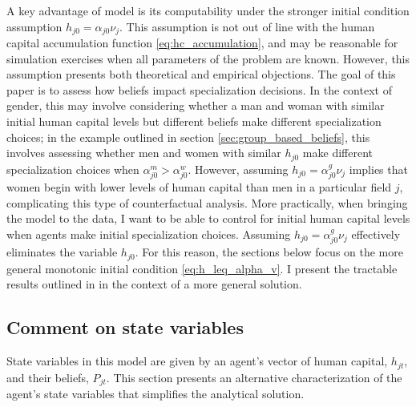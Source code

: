 A key advantage of  model is its computability under the stronger initial condition assumption $h_{j0} = \alpha_{j0} \nu_j$.
This assumption is not out of line with the human capital accumulation function \eqref{eq:hc_accumulation}, and may be reasonable for simulation exercises when all parameters of the problem are known.
However, this assumption presents both theoretical and empirical objections.
The goal of this paper is to assess how beliefs impact specialization decisions.
In the context of gender, this may involve considering whether a man and woman with similar initial human capital levels but different beliefs make different specialization choices; in the example outlined in section \ref{sec:group_based_beliefs}, this involves assessing whether men and women with similar $h_{j0}$ make different specialization choices when $\alpha_{j0}^m > \alpha_{j0}^w$.
However, assuming $h_{j0} = \alpha_{j0}^g \nu_j$ implies that women begin with lower levels of human capital than men in a particular field $j$, complicating this type of counterfactual analysis.
More practically, when bringing the model to the data,  I want to be able to control for initial human capital levels when agents make initial specialization choices. 
Assuming $h_{j0} = \alpha_{j0}^g \nu_j$ effectively eliminates the variable $h_{j0}$.
For this reason, the sections below focus on the more general monotonic initial condition \eqref{eq:h_leq_alpha_v}.
I present the tractable results outlined in \textcite{AF20} in the context of a more general solution.

\subsection{Comment on state variables}\label{sec:comment_state_vars}

State variables in this model are given by an agent's vector of human capital, $h_{jt}$, and their beliefs, $P_{jt}$.
This section presents an alternative characterization of the agent's state variables that simplifies the analytical solution.

